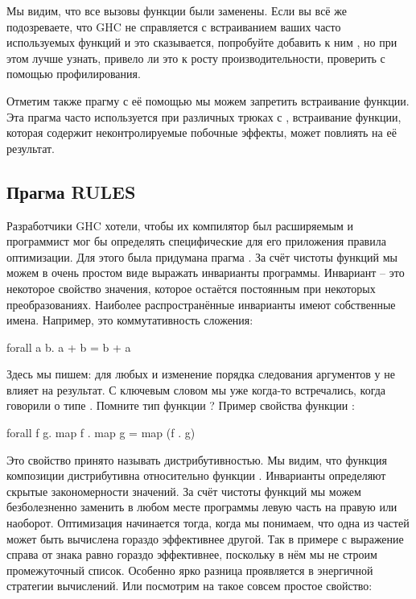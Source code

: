 Мы видим, что все вызовы функции  были заменены. Если вы всё же
подозреваете, что GHC не справляется с встраиванием ваших часто
используемых функций и это сказывается, попробуйте добавить к ним
, но при этом лучше узнать, привело ли это к росту
производительности, проверить с помощью профилирования.

Отметим также прагму  с её помощью мы можем запретить
встраивание функции. Эта прагма часто используется при различных трюках
с , встраивание функции, которая содержит
неконтролируемые побочные эффекты, может повлиять на её результат.

\subsection{Прагма RULES}

Разработчики GHC хотели, чтобы их компилятор был расширяемым и
программист мог бы определять специфические для его приложения правила
оптимизации. Для этого была придумана прагма . За счёт чистоты
функций мы можем в очень простом виде выражать инварианты программы.
Инвариант -- это некоторое свойство значения, которое остаётся
постоянным при некоторых преобразованиях. Наиболее распространённые
инварианты имеют собственные имена. Например, это коммутативность
сложения:


\begin{code}
forall a b. a + b = b + a
\end{code}

Здесь мы пишем: для любых  и  изменение порядка следования
аргументов у \In{(+)} не влияет на результат. С ключевым словом
 мы уже когда-то встречались, когда говорили о типе .
Помните тип функции ? Пример свойства функции :


\begin{code}
forall f g.   map f . map g = map (f . g)
\end{code}

Это свойство принято называть дистрибутивностью. Мы видим, что функция
композиции дистрибутивна относительно функции . Инварианты
определяют скрытые закономерности значений. За счёт чистоты функций мы
можем безболезненно заменить в любом месте программы левую часть на
правую или наоборот. Оптимизация начинается тогда, когда мы понимаем,
что одна из частей может быть вычислена гораздо эффективнее другой. Так
в примере с  выражение справа от знака равно гораздо
эффективнее, поскольку в нём мы не строим промежуточный список. Особенно
ярко разница проявляется в энергичной стратегии вычислений. Или
посмотрим на такое совсем простое свойство:


